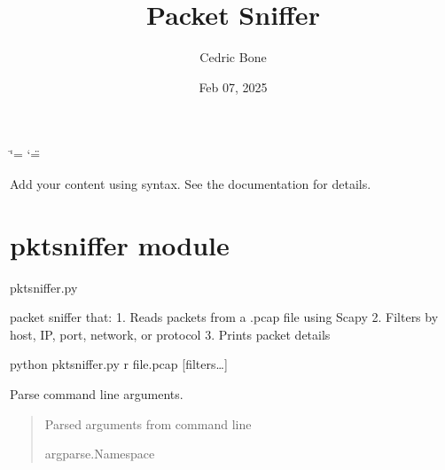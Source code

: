 \documentclass[letterpaper,10pt,english]{sphinxmanual}
\title{Packet Sniffer}
\date{Feb 07, 2025}
\author{Cedric Bone}
\begin{document}
\ifdefined\shorthandoff
  \ifnum\catcode`\=\string=\active\shorthandoff{=}\fi
  \ifnum\catcode`\"=\active{}\fi
\fi

\pagestyle{empty}
\sphinxmaketitle
\pagestyle{plain}
\sphinxtableofcontents
\pagestyle{normal}
\label{\detokenize{index::doc}}


\sphinxAtStartPar
Add your content using  syntax. See the
documentation for details.

\sphinxstepscope


\chapter{pktsniffer module}
\label{\detokenize{pktsniffer:module-pktsniffer}}\label{\detokenize{pktsniffer:pktsniffer-module}}\label{\detokenize{pktsniffer::doc}}
\sphinxAtStartPar
pktsniffer.py

\sphinxAtStartPar
packet sniffer that:
1. Reads packets from a .pcap file using Scapy
2. Filters by host, IP, port, network, or protocol
3. Prints packet details
\begin{description}
\sphinxAtStartPar
python pktsniffer.py \sphinxhyphen{}r file.pcap {[}filters…{]}

\end{description}

\begin{fulllineitems}
\label{\detokenize{pktsniffer:pktsniffer.arguments}}
\pysigstartsignatures
\pysiglinewithargsret
{}
{}
{}
\pysigstopsignatures
\sphinxAtStartPar
Parse command line arguments.
\begin{quote}\begin{description}
\sphinxAtStartPar
Parsed arguments from command line

\sphinxAtStartPar
argparse.Namespace

\end{description}\end{quote}

\end{fulllineitems}
\end{document}
